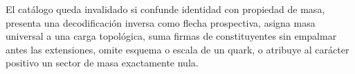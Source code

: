 \begin{criterion}
\label{crit:integridad-catalogo-tipado}
El catálogo queda invalidado si confunde identidad con propiedad de masa,
presenta una decodificación inversa como flecha prospectiva, asigna masa
universal a una carga topológica, suma firmas de constituyentes sin empalmar
antes las extensiones, omite esquema o escala de un quark, o atribuye al
carácter positivo un sector de masa exactamente nula.
\end{criterion}
